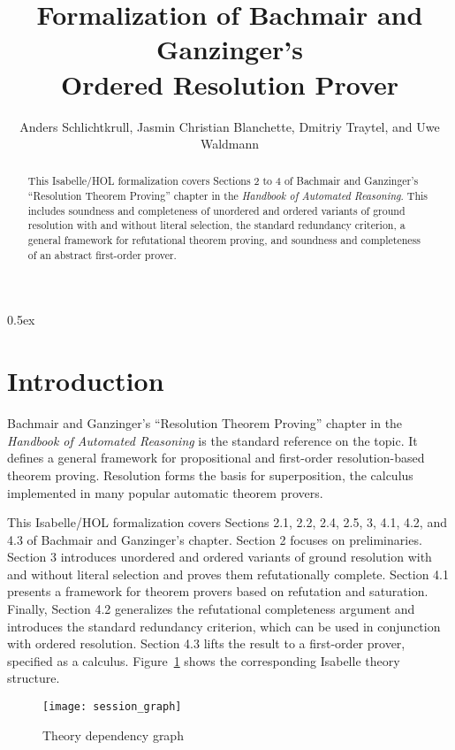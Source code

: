 \documentclass[10pt,a4paper]{article}
\begin{document}
\title{Formalization of Bachmair and Ganzinger's \\ Ordered Resolution Prover}
\author{Anders Schlichtkrull, Jasmin Christian Blanchette, Dmitriy Traytel, and Uwe Waldmann}

\maketitle

\begin{abstract}
\noindent
This Isabelle/HOL formalization covers Sections 2 to 4 of Bachmair and
Ganzinger's ``Resolution Theorem Proving'' chapter in the \emph{Handbook of
Automated Reasoning}. This includes soundness and completeness of unordered
and ordered variants of ground resolution with and without literal selection,
the standard redundancy criterion, a general framework for refutational
theorem proving, and soundness and completeness of an abstract first-order
prover.
\end{abstract}

\tableofcontents

\parindent 0pt
\parskip 0.5ex

\section{Introduction}

Bachmair and Ganzinger's ``Resolution Theorem Proving'' chapter
in the \emph{Handbook of Automated Reasoning} is the standard reference on the
topic. It defines a general framework for propositional and first-order
resolution-based theorem proving. Resolution forms the basis for
superposition, the calculus implemented in many popular automatic theorem
provers.

\medskip

This Isabelle/HOL formalization covers Sections 2.1, 2.2, 2.4, 2.5, 3, 4.1,
4.2, and 4.3 of Bachmair and Ganzinger's chapter. Section 2 focuses on
preliminaries. Section 3 introduces unordered and ordered variants of ground
resolution with and without literal selection and proves them refutationally
complete. Section 4.1 presents a framework for theorem provers based on
refutation and saturation. Finally, Section 4.2 generalizes the refutational
completeness argument and introduces the standard redundancy criterion, which
can be used in conjunction with ordered resolution. Section 4.3 lifts the
result to a first-order prover, specified as a calculus. Figure~\ref{fig:thys}
shows the corresponding Isabelle theory structure.

\begin{figure}
\begin{center}
  \texttt{[image: session\_graph]}
\end{center}
\caption{Theory dependency graph}
\label{fig:thys}
\end{figure}



% 
% 
\end{document}
